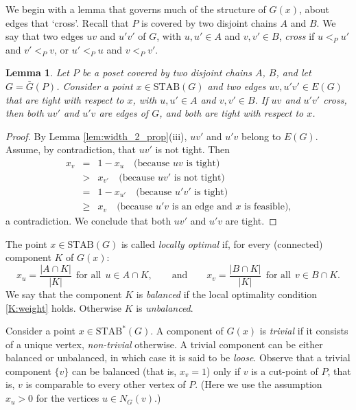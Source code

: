 \documentclass{article} \usepackage{fullpage}
\newtheorem{lemma}{Lemma}
\newcommand{\STAB}{\mathrm{STAB}}
\begin{document}
We begin with a lemma that governs much of the structure of $G(x)$, about edges that `cross'. Recall that $P$ is covered by two disjoint chains $A$ and $B$. We say that two edges $uv$ and $u'v'$ of $G$, with $u, u' \in A$ and $v, v' \in B$, {\sl cross\/} if $u <_P u'$ and $v' <_P v$, or $u' <_P u$ and $v <_P v'$. 

\begin{lemma}
\label{lem:crossing}
Let $P$ be a poset covered by two disjoint chains $A$, $B$, and let $G = \bar{G}(P)$. Consider a point $x \in \STAB(G)$ and two edges $uv, u'v' \in E(G)$ that are tight with respect to $x$, with $u, u' \in A$ and $v, v' \in B$. If $uv$ and $u'v'$ cross, then both $uv'$ and $u'v$ are edges of $G$, and both are tight with respect to $x$.
\end{lemma}

\begin{proof}
By Lemma \ref{lem:width_2_prop}(iii), $uv'$ and $u'v$ belong to $E(G)$. Assume, by contradiction, that $uv'$ is not tight. Then
\begin{eqnarray*}
x_{v} &=& 1-x_{u} \quad \text{(because $uv$ is tight)}\\
    &>& x_{v'} \quad \text{(because $uv'$ is not tight)}\\
    &=& 1-x_{u'} \quad \text{(because $u'v'$ is tight)}\\
    &\geq& x_{v} \quad \text{(because $u'v$ is an edge and $x$ is feasible),}
\end{eqnarray*}
a contradiction. We conclude that both $uv'$ and $u'v$ are tight.
\end{proof}

The point $x \in \STAB(G)$ is called {\sl locally optimal\/} if, for every (connected) component $K$ of $G(x)$:
\begin{equation}
\label{K:weight}
x_{u} = \frac{|A \cap K|}{|K|}\ \ \text{for all}\ \ u \in A \cap K, 
\qquad\text{and}\qquad
x_{v} = \frac{|B \cap K|}{|K|}\ \ \text{for all} \ \ v \in B \cap K.
\end{equation}
We say that the component $K$ is {\sl balanced\/} if the local optimality condition \eqref{K:weight} holds. Otherwise $K$ is {\sl unbalanced}. 

Consider a point $x \in \STAB^*(G)$. A component of $G(x)$ is {\sl trivial\/} if it consists of a unique vertex, {\sl non-trivial\/} otherwise. A trivial component can be either balanced or unbalanced, in which case it is said to be {\sl loose}. Observe that a trivial component $\{v\}$ can be balanced (that is, $x_v=1$) only if $v$ is a cut-point of $P$, that is, $v$ is comparable to every other vertex of $P$. (Here we use the assumption $x_u > 0$ for the vertices $u \in N_G(v)$.)
\end{document}
